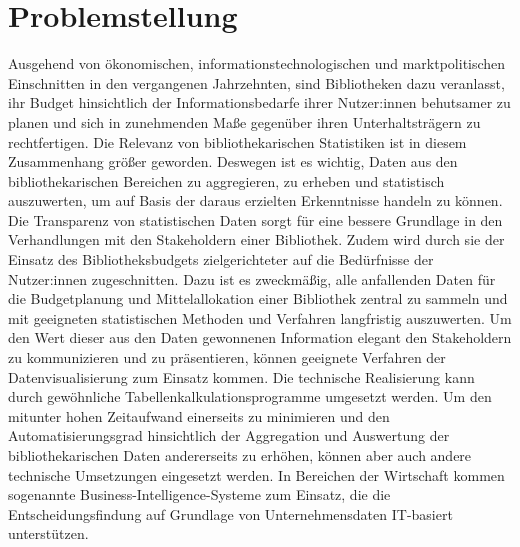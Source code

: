\section{Problemstellung}
Ausgehend von ökonomischen, informationstechnologischen und marktpolitischen Einschnitten in den
vergangenen Jahrzehnten, sind Bibliotheken dazu veranlasst, ihr Budget hinsichtlich der Informationsbedarfe
ihrer Nutzer:innen behutsamer zu planen und sich in zunehmenden Maße gegenüber ihren Unterhaltsträgern zu rechtfertigen.
Die Relevanz von bibliothekarischen Statistiken ist in diesem Zusammenhang größer geworden.
Deswegen ist es wichtig, Daten aus den bibliothekarischen Bereichen zu aggregieren, zu erheben und statistisch
auszuwerten, um auf Basis der daraus erzielten Erkenntnisse handeln zu können. 
Die Transparenz von statistischen Daten sorgt für eine bessere Grundlage in den Verhandlungen mit den Stakeholdern
einer Bibliothek. Zudem wird durch sie der Einsatz des Bibliotheksbudgets zielgerichteter auf die Bedürfnisse der Nutzer:innen zugeschnitten.
Dazu ist es zweckmäßig, alle anfallenden Daten für die Budgetplanung und Mittelallokation einer Bibliothek zentral zu sammeln und mit geeigneten 
statistischen Methoden und Verfahren langfristig auszuwerten. Um den Wert dieser aus den Daten gewonnenen Information elegant den Stakeholdern zu kommunizieren und zu präsentieren,
können geeignete Verfahren der Datenvisualisierung zum Einsatz kommen. Die technische Realisierung kann durch gewöhnliche Tabellenkalkulationsprogramme umgesetzt werden.
Um den mitunter hohen Zeitaufwand einerseits zu minimieren und den Automatisierungsgrad hinsichtlich der Aggregation und Auswertung der bibliothekarischen Daten 
andererseits zu erhöhen, können aber auch andere technische Umsetzungen eingesetzt werden. In Bereichen der Wirtschaft kommen sogenannte Business-Intelligence-Systeme zum Einsatz,
die die Entscheidungsfindung auf Grundlage von Unternehmensdaten IT-basiert unterstützen.

